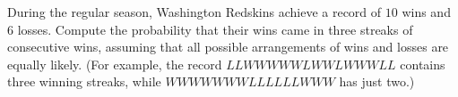 During the regular season, Washington Redskins achieve a record of $10$ wins and $6$ losses. Compute the probability that their wins came in three streaks of consecutive wins, assuming that all possible arrangements of wins and losses are equally likely. (For example, the record $LLWWWWWLWWLWWWLL$ contains three winning streaks, while $WWWWWWWLLLLLLWWW$ has just two.)